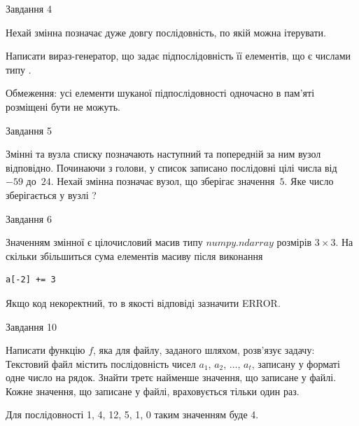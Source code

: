 \documentclass[12pt, ukrainian]{article}
\begin{document}
{               
{\begin{center}Завдання {4}\end{center}}
\vspace{-6mm}
Нехай змінна  позначає дуже довгу послідовність, по якій можна ітерувати.

Написати вираз-генератор, що задає підпослідовність її елементів, що є числами типу .

Обмеження: усі елементи шуканої підпослідовності одночасно в пам'яті розміщені бути не можуть.\par

\vspace{10mm}
               
{\begin{center}Завдання {5}\end{center}}
\vspace{-6mm}
Змінні  та  вузла списку позначають наступний та попередній за ним вузол відповідно. Починаючи з голови, у список записано послідовні цілі числа від~$-59$ до~$24$. Нехай змінна  позначає вузол, що зберігає значення~$5$.
Яке число зберігається у вузлі  ?\par

               
{\begin{center}Завдання {6}\end{center}}
\vspace{-6mm}
Значенням змінної  є цілочисловий масив типу $numpy.ndarray$ розмірів $3{\times}3$. На скільки збільшиться сума елементів масиву  після виконання
\begin{verbatim}
a[-2] += 3
\end{verbatim}


Якщо код некоректний, то в якості відповіді зазначити ERROR.\par

               
{\begin{center}Завдання {10}\end{center}}
\vspace{-6mm}

Написати функцію $f$, яка для файлу, заданого шляхом, розв’язує задачу:\\ Текстовий файл містить послідовність чисел $a_1$, $a_2$, $\ldots$, $a_t$, записану у форматі одне число на рядок. Знайти третє найменше значення, що записане у файлі. Кожне значення, що записане у файлі, враховується тільки один раз. \par
Для послідовності 1, 4, 12, 5, 1, 0 таким значенням буде 4.

}
\end{document}
